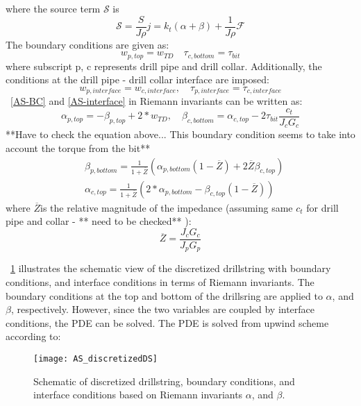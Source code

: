 where the source term $\mathcal{S}$ is
\begin{equation}\label{AS-source}
  \mathcal{S} = \frac{S}{J \rho} j= k_t(\alpha + \beta) + \frac{1}{J \rho} \mathcal{F}
\end{equation}
The boundary conditions are given as:
\begin{equation}\label{AS-BC}
  w_{p,top} = w_{TD} \quad \tau_{c,bottom} = \tau_{bit}
\end{equation}
where subscript p, c represents drill pipe and drill collar.
Additionally, the conditions at the drill pipe - drill collar interface are imposed:
\begin{equation}\label{AS-interface}
  w_{p,interface} = w_{c,interface}, \quad \tau_{p,interface} = \tau_{c,interface}
\end{equation}
\equationname~\ref{AS-BC} and \ref{AS-interface} in Riemann invariants can be written as:
\begin{equation}\label{AS-riemannBC}
  \alpha_{p,top} = -\beta_{p,top} + 2*w_{TD}, \quad \beta_{c,bottom} = \alpha_{c,top} - 2\tau_{bit} \frac{c_t}{J_c G_c}
\end{equation}
**Have to check the equation above... This boundary condition seems to take into account the torque from the bit**
\begin{equation}\label{AS-riemanninterface}
\begin{split}
    & \beta_{p,bottom} = \frac{1}{1+\overline{Z}}\left(\alpha_{p,bottom}(1-\overline{Z}) + 2\overline{Z}\beta_{c,top} \right) \\
    & \alpha_{c,top} = \frac{1}{1+\overline{Z}}\left(2*\alpha_{p,bottom} - \beta_{c,top}(1-\overline{Z})\right)
\end{split}
\end{equation}
where $\overline{Z}$is the relative magnitude of the impedance (assuming same $c_t$ for drill pipe and collar - ** need to be checked** ):
\begin{equation}\label{AS_Zbar}
  \overline{Z} = \frac{J_c G_c}{J_p G_p}
\end{equation}

\figurename~\ref{AS_discretizeDS} illustrates the schematic view of the discretized drillstring with boundary conditions, and interface conditions in terms of Riemann invariants. The boundary conditions at the top and bottom of the drillsring are applied to $\alpha$, and $\beta$, respectively. However, since the two variables are coupled by interface conditions, the PDE can be solved. 
The PDE is solved from upwind scheme according to:

\newpage
\begin{figure}[ht]
  \centering
  \texttt{[image: AS\_discretizedDS]}
  \caption[Schematic of discretized drillstring and boundary conditions]{Schematic of discretized drillstring, boundary conditions, and interface conditions based on Riemann invariants $\alpha$, and $\beta$.}\label{AS_discretizeDS}
\end{figure}

